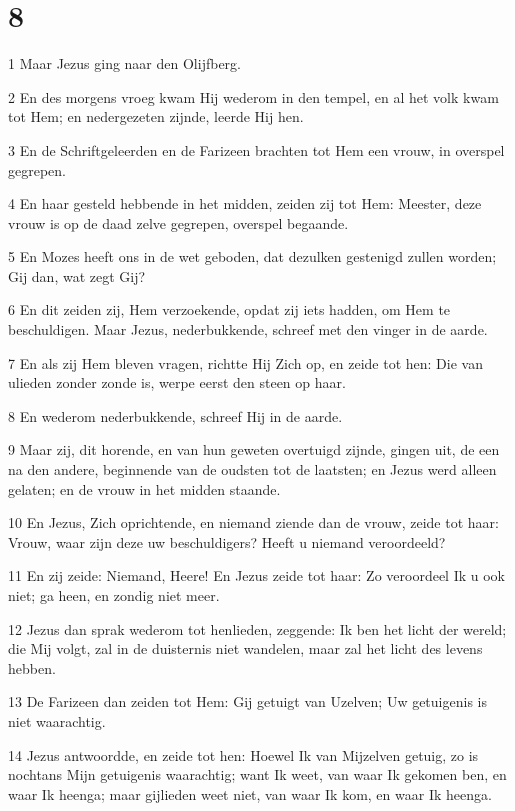 \chapter{8}

\par 1 Maar Jezus ging naar den Olijfberg.
\par 2 En des morgens vroeg kwam Hij wederom in den tempel, en al het volk kwam tot Hem; en nedergezeten zijnde, leerde Hij hen.
\par 3 En de Schriftgeleerden en de Farizeen brachten tot Hem een vrouw, in overspel gegrepen.
\par 4 En haar gesteld hebbende in het midden, zeiden zij tot Hem: Meester, deze vrouw is op de daad zelve gegrepen, overspel begaande.
\par 5 En Mozes heeft ons in de wet geboden, dat dezulken gestenigd zullen worden; Gij dan, wat zegt Gij?
\par 6 En dit zeiden zij, Hem verzoekende, opdat zij iets hadden, om Hem te beschuldigen. Maar Jezus, nederbukkende, schreef met den vinger in de aarde.
\par 7 En als zij Hem bleven vragen, richtte Hij Zich op, en zeide tot hen: Die van ulieden zonder zonde is, werpe eerst den steen op haar.
\par 8 En wederom nederbukkende, schreef Hij in de aarde.
\par 9 Maar zij, dit horende, en van hun geweten overtuigd zijnde, gingen uit, de een na den andere, beginnende van de oudsten tot de laatsten; en Jezus werd alleen gelaten; en de vrouw in het midden staande.
\par 10 En Jezus, Zich oprichtende, en niemand ziende dan de vrouw, zeide tot haar: Vrouw, waar zijn deze uw beschuldigers? Heeft u niemand veroordeeld?
\par 11 En zij zeide: Niemand, Heere! En Jezus zeide tot haar: Zo veroordeel Ik u ook niet; ga heen, en zondig niet meer.
\par 12 Jezus dan sprak wederom tot henlieden, zeggende: Ik ben het licht der wereld; die Mij volgt, zal in de duisternis niet wandelen, maar zal het licht des levens hebben.
\par 13 De Farizeen dan zeiden tot Hem: Gij getuigt van Uzelven; Uw getuigenis is niet waarachtig.
\par 14 Jezus antwoordde, en zeide tot hen: Hoewel Ik van Mijzelven getuig, zo is nochtans Mijn getuigenis waarachtig; want Ik weet, van waar Ik gekomen ben, en waar Ik heenga; maar gijlieden weet niet, van waar Ik kom, en waar Ik heenga.
